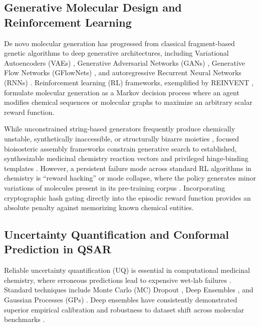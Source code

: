 \documentclass[journal]{IEEEtran}
\begin{document}
\subsection{Generative Molecular Design and Reinforcement Learning}
De novo molecular generation has progressed from classical fragment-based genetic algorithms to deep generative architectures, including Variational Autoencoders (VAEs) \cite{gomez2018automatic}, Generative Adversarial Networks (GANs) \cite{guimaraes2017objective}, Generative Flow Networks (GFlowNets) \cite{bengio2021flow}, and autoregressive Recurrent Neural Networks (RNNs) \cite{segler2018generating, olivecrona2017molecular}. Reinforcement learning (RL) frameworks, exemplified by REINVENT \cite{olivecrona2017molecular, blaschke2020reinvent}, formulate molecular generation as a Markov decision process where an agent modifies chemical sequences or molecular graphs to maximize an arbitrary scalar reward function.

While unconstrained string-based generators frequently produce chemically unstable, synthetically inaccessible, or structurally bizarre moieties \cite{gao2022synthesizability}, focused bioisosteric assembly frameworks constrain generative search to established, synthesizable medicinal chemistry reaction vectors and privileged hinge-binding templates \cite{jordan2014medicinal, fink2022conformation}. However, a persistent failure mode across standard RL algorithms in chemistry is ``reward hacking'' or mode collapse, where the policy generates minor variations of molecules present in its pre-training corpus \cite{skalic2019from}. Incorporating cryptographic hash gating directly into the episodic reward function provides an absolute penalty against memorizing known chemical entities.

\subsection{Uncertainty Quantification and Conformal Prediction in QSAR}
Reliable uncertainty quantification (UQ) is essential in computational medicinal chemistry, where erroneous predictions lead to expensive wet-lab failures \cite{hirschfeld2020uncertainty, soleimany2021evidential}. Standard techniques include Monte Carlo (MC) Dropout \cite{gal2016dropout}, Deep Ensembles \cite{lakshminarayanan2017simple}, and Gaussian Processes (GPs) \cite{rasmussen2006gaussian}. Deep ensembles have consistently demonstrated superior empirical calibration and robustness to dataset shift across molecular benchmarks \cite{ovadia2019can, scalia2020evaluating}. 
\end{document}
